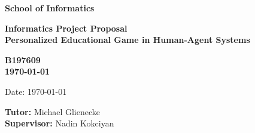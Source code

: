 \documentclass[a4paper,11pt]{article}
\newcommand{\examnumber}{B197609}
\newcommand{\field}{Personalized Educational Game in Human-Agent Systems}
\newcommand{\tutor}{Michael Glienecke}
\newcommand{\supervisor}{Nadin Kokciyan}
\begin{document}
\begin{minipage}[b]{110mm}
        {\Huge\bf School of Informatics
        \vspace*{17mm}}
\end{minipage}
\hfill
\begin{minipage}[t]{40mm}               
\end{minipage}
\par\noindent
\vspace*{2cm}
\begin{center}
        \Large\bf Informatics Project Proposal \\
        \Large\bf \field
\end{center}
\vspace*{1.5cm}
\begin{center}
        \bf \examnumber\\
        \monthyeardate\today
\end{center}
\vspace*{5mm}

%
%                       
\begin{abstract}
        The concept of Internet of things(IoT) has been widely known by more and more people in recent years. The potential privacy threats are bright to people due to the characteristic of IoT ecosystem because it may disclose individuals' personal privacy without their awareness. In order to tackle this problem, we plan to design an educational game that could teach people what kind of IoT devices may involve privacy issues and help people better understand their privacy preferences. 
\end{abstract}

\vspace*{1cm}

\vspace*{3cm}
Date: \today

\vfill
{\bf Tutor:} \tutor\\
{\bf Supervisor:} \supervisor
\newpage
\end{document}
